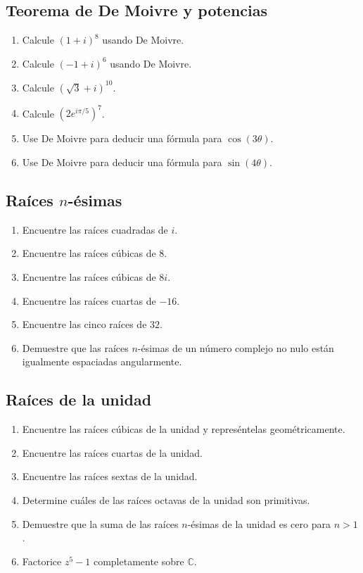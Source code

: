 \subsection{Teorema de De Moivre y potencias}
\begin{enumerate}
\item Calcule $(1+i)^8$ usando De Moivre.
\item Calcule $(-1+i)^6$ usando De Moivre.
\item Calcule $(\sqrt3+i)^{10}$.
\item Calcule $\left(2e^{i\pi/5}\right)^7$.
\item Use De Moivre para deducir una fórmula para $\cos(3\theta)$.
\item Use De Moivre para deducir una fórmula para $\sin(4\theta)$.
\end{enumerate}

\subsection{Raíces $n$-ésimas}
\begin{enumerate}
\item Encuentre las raíces cuadradas de $i$.
\item Encuentre las raíces cúbicas de $8$.
\item Encuentre las raíces cúbicas de $8i$.
\item Encuentre las raíces cuartas de $-16$.
\item Encuentre las cinco raíces de $32$.
\item Demuestre que las raíces $n$-ésimas de un número complejo no nulo están igualmente espaciadas angularmente.
\end{enumerate}

\subsection{Raíces de la unidad}
\begin{enumerate}
\item Encuentre las raíces cúbicas de la unidad y represéntelas geométricamente.
\item Encuentre las raíces cuartas de la unidad.
\item Encuentre las raíces sextas de la unidad.
\item Determine cuáles de las raíces octavas de la unidad son primitivas.
\item Demuestre que la suma de las raíces $n$-ésimas de la unidad es cero para $n>1$.
\item Factorice $z^5-1$ completamente sobre $\mathbb{C}$.
\end{enumerate}

